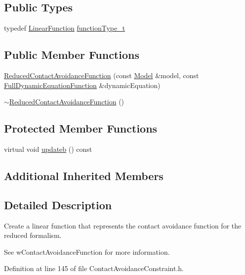 \subsection*{Public Types}
\begin{DoxyCompactItemize}
\item 
typedef \hyperlink{classocra_1_1LinearFunction}{Linear\+Function} \hyperlink{classocra_1_1ReducedContactAvoidanceFunction_ae1d0c9b1c213515eabdb15cb7dc82869}{function\+Type\+\_\+t}
\end{DoxyCompactItemize}
\subsection*{Public Member Functions}
\begin{DoxyCompactItemize}
\item 
\hyperlink{classocra_1_1ReducedContactAvoidanceFunction_ae2183d53a13985590ee4f5cf59083803}{Reduced\+Contact\+Avoidance\+Function} (const \hyperlink{classocra_1_1Model}{Model} \&model, const \hyperlink{classocra_1_1FullDynamicEquationFunction}{Full\+Dynamic\+Equation\+Function} \&dynamic\+Equation)
\item 
\hyperlink{classocra_1_1ReducedContactAvoidanceFunction_a7a1844143947f714f2e0207d9f56834a}{$\sim$\+Reduced\+Contact\+Avoidance\+Function} ()
\end{DoxyCompactItemize}
\subsection*{Protected Member Functions}
\begin{DoxyCompactItemize}
\item 
virtual void \hyperlink{classocra_1_1ReducedContactAvoidanceFunction_ac39227a19a650de28f4ae603511bfb73}{updateb} () const
\end{DoxyCompactItemize}
\subsection*{Additional Inherited Members}


\subsection{Detailed Description}
Create a linear function that represents the contact avoidance function for the reduced formalism. 

See w\+Contact\+Avoidance\+Function for more information. 

Definition at line 145 of file Contact\+Avoidance\+Constraint.\+h.



